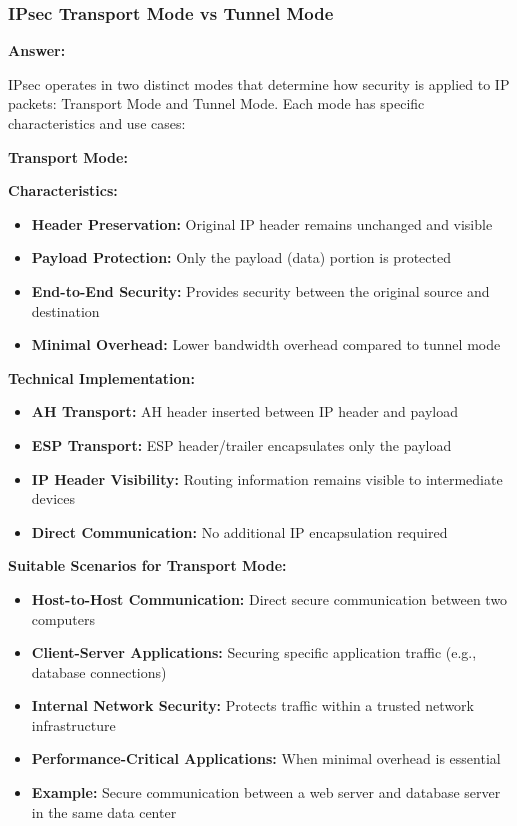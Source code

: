 \documentclass[12pt,a4paper]{article}
\begin{document}
\subsubsection{IPsec Transport Mode vs Tunnel Mode}

\textbf{Answer:}

IPsec operates in two distinct modes that determine how security is applied to IP packets: Transport Mode and Tunnel Mode. Each mode has specific characteristics and use cases:

\textbf{Transport Mode:}

\textbf{Characteristics:}
\begin{itemize}
    \item \textbf{Header Preservation:} Original IP header remains unchanged and visible
    \item \textbf{Payload Protection:} Only the payload (data) portion is protected
    \item \textbf{End-to-End Security:} Provides security between the original source and destination
    \item \textbf{Minimal Overhead:} Lower bandwidth overhead compared to tunnel mode
\end{itemize}

\textbf{Technical Implementation:}
\begin{itemize}
    \item \textbf{AH Transport:} AH header inserted between IP header and payload
    \item \textbf{ESP Transport:} ESP header/trailer encapsulates only the payload
    \item \textbf{IP Header Visibility:} Routing information remains visible to intermediate devices
    \item \textbf{Direct Communication:} No additional IP encapsulation required
\end{itemize}

\textbf{Suitable Scenarios for Transport Mode:}
\begin{itemize}
    \item \textbf{Host-to-Host Communication:} Direct secure communication between two computers
    \item \textbf{Client-Server Applications:} Securing specific application traffic (e.g., database connections)
    \item \textbf{Internal Network Security:} Protects traffic within a trusted network infrastructure
    \item \textbf{Performance-Critical Applications:} When minimal overhead is essential
    \item \textbf{Example:} Secure communication between a web server and database server in the same data center
\end{itemize}
\end{document}
